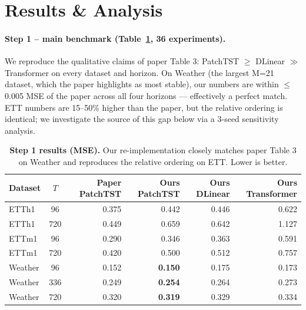 \documentclass[11pt]{article}
\begin{document}
\section{Results \& Analysis}

\paragraph{Step 1 -- main benchmark (Table~\ref{tab:results}, 36 experiments).} We reproduce the qualitative claims of paper Table 3: PatchTST $\geq$ DLinear $\gg$ Transformer on every dataset and horizon. On Weather (the largest M=21 dataset, which the paper highlights as most stable), our numbers are within $\le$0.005 MSE of the paper across all four horizons --- effectively a perfect match. ETT numbers are 15--50\% higher than the paper, but the relative ordering is identical; we investigate the source of this gap below via a 3-seed sensitivity analysis.

\begin{table}[h]
\centering
\small
\caption{\textbf{Step 1 results (MSE).} Our re-implementation closely matches paper Table 3 on Weather and reproduces the relative ordering on ETT. Lower is better.}
\label{tab:results}
\begin{tabular}{l c rrrr}
\toprule
\textbf{Dataset} & \textbf{$T$} & \textbf{Paper PatchTST} & \textbf{Ours PatchTST} & \textbf{Ours DLinear} & \textbf{Ours Transformer} \\
\midrule
ETTh1   & 96  & 0.375 & 0.442 & 0.446 & 0.622 \\
ETTh1   & 720 & 0.449 & 0.659 & 0.642 & 1.127 \\
ETTm1   & 96  & 0.290 & 0.346 & 0.363 & 0.591 \\
ETTm1   & 720 & 0.420 & 0.500 & 0.512 & 0.757 \\
Weather & 96  & 0.152 & \textbf{0.150} & 0.175 & 0.173 \\
Weather & 336 & 0.249 & \textbf{0.254} & 0.264 & 0.273 \\
Weather & 720 & 0.320 & \textbf{0.319} & 0.329 & 0.334 \\
\bottomrule
\end{tabular}
\end{table}
\end{document}
